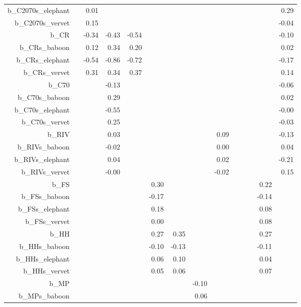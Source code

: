 \begin{table}[ht]
\begin{tabular}{rrrrrrrrrrrrrr}
  b\_C2070s\_elephant &  & 0.01 &  &  &  &  &  &  &  &  &  &  & 0.29 \\ 
  b\_C2070s\_vervet &  & 0.15 &  &  &  &  &  &  &  &  &  &  & -0.04 \\ 
  b\_CR &  & -0.34 & -0.43 & -0.54 &  &  &  &  &  &  &  &  & -0.10 \\ 
  b\_CRs\_baboon &  & 0.12 & 0.34 & 0.20 &  &  &  &  &  &  &  &  & 0.02 \\ 
  b\_CRs\_elephant &  & -0.54 & -0.86 & -0.72 &  &  &  &  &  &  &  &  & -0.17 \\ 
  b\_CRs\_vervet &  & 0.31 & 0.34 & 0.37 &  &  &  &  &  &  &  &  & 0.14 \\ 
  b\_C70 &  &  & -0.13 &  &  &  &  &  &  &  &  &  & -0.06 \\ 
  b\_C70s\_baboon &  &  & 0.29 &  &  &  &  &  &  &  &  &  & 0.02 \\ 
  b\_C70s\_elephant &  &  & -0.55 &  &  &  &  &  &  &  &  &  & -0.00 \\ 
  b\_C70s\_vervet &  &  & 0.25 &  &  &  &  &  &  &  &  &  & -0.03 \\ 
  b\_RIV &  &  & 0.03 &  &  &  &  & 0.09 &  &  &  &  & -0.13 \\ 
  b\_RIVs\_baboon &  &  & -0.02 &  &  &  &  & 0.00 &  &  &  &  & 0.04 \\ 
  b\_RIVs\_elephant &  &  & 0.04 &  &  &  &  & 0.02 &  &  &  &  & -0.21 \\ 
  b\_RIVs\_vervet &  &  & -0.00 &  &  &  &  & -0.02 &  &  &  &  & 0.15 \\ 
  b\_FS &  &  &  &  & 0.30 &  &  &  &  &  &  & 0.22 &  \\ 
  b\_FSs\_baboon &  &  &  &  & -0.17 &  &  &  &  &  &  & -0.14 &  \\ 
  b\_FSs\_elephant &  &  &  &  & 0.18 &  &  &  &  &  &  & 0.08 &  \\ 
  b\_FSs\_vervet &  &  &  &  & 0.00 &  &  &  &  &  &  & 0.08 &  \\ 
  b\_HH &  &  &  &  & 0.27 & 0.35 &  &  &  &  &  & 0.27 &  \\ 
  b\_HHs\_baboon &  &  &  &  & -0.10 & -0.13 &  &  &  &  &  & -0.11 &  \\ 
  b\_HHs\_elephant &  &  &  &  & 0.06 & 0.10 &  &  &  &  &  & 0.04 &  \\ 
  b\_HHs\_vervet &  &  &  &  & 0.05 & 0.06 &  &  &  &  &  & 0.07 &  \\ 
  b\_MP &  &  &  &  &  &  & -0.10 &  &  &  &  &  &  \\ 
  b\_MPs\_baboon &  &  &  &  &  &  & 0.06 &  &  &  &  &  &  \\ 

\end{tabular}
\end{table}
